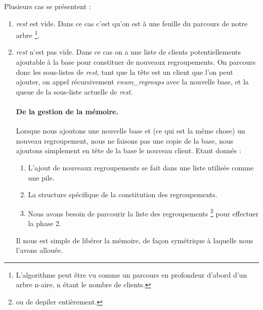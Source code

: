\documentclass[a4paper,10pt]{article}
\begin{document}
Plusieurs cas se présentent :
\begin{enumerate}
\item \emph{rest} est vide. Dans ce cas c'est qu'on est à une feuille du parcours de notre arbre
  \footnote{L'algorithme peut être vu comme un parcours en profondeur d'abord d'un arbre n-aire, n étant le nombre
  de clients.}.
\item \emph{rest} n'est pas vide. Dans ce cas on a une liste de clients potentiellements ajoutable à la base pour constituer
  de nouveaux regroupements. On parcours donc les sous-listes de \emph{rest}, tant que la tête est un client que l'on peut
  ajouter, on appel récursivement \emph{enum\_regroups} avec la nouvelle base, et la queue de la sous-liste actuelle de
  \emph{rest}. 
  

\paragraph{De la gestion de la mémoire.}

Lorsque nous ajoutons une nouvelle base et (ce qui est la même chose) un nouveau regroupement, nous ne faisons pas une copie
de la base, nous ajoutons simplement en tête de la base le nouveau client. Etant donnés :
\begin{enumerate}
  \item L'ajout de nouveaux regroupements se fait dans une liste utilisée comme une pile.
  \item La structure spécifique de la constitution des regroupements.
  \item Nous avons besoin de parcourir la liste des regroupements
    \footnote{ou de depiler entièrement.} pour effectuer la phase 2.
\end{enumerate}
Il nous est simple de libérer la mémoire, de façon symétrique à laquelle nous l'avons allouée.


\end{enumerate}
\end{document}

